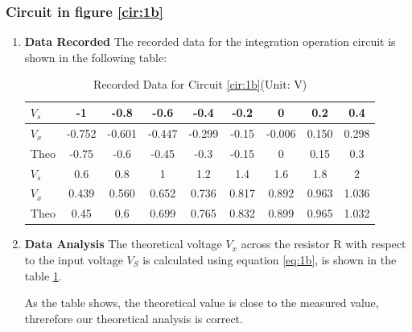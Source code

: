         \subsubsection{Circuit in figure \ref{cir:1b}}
        \begin{enumerate}[I]
            \item \textbf{Data Recorded}\newline
                The recorded data for the integration operation circuit is shown in the following table:
                \begin{table}[H]
                    \centering
                    \begin{tabular}{l|cccccccc}
                        \toprule
                        $V_s$ & -1     & -0.8   & -0.6   & -0.4   & -0.2  & 0      & 0.2   & 0.4   \\
                        \midrule
                        $V_x$ & -0.752 & -0.601 & -0.447 & -0.299 & -0.15 & -0.006 & 0.150 & 0.298 \\
                        Theo  & -0.75  & -0.6   & -0.45  & -0.3   & -0.15 & 0      & 0.15  & 0.3   \\
                        \bottomrule
                        \toprule
                        $V_s$ & 0.6    & 0.8    & 1      & 1.2    & 1.4   & 1.6    & 1.8   & 2     \\
                        \midrule
                        $V_x$ & 0.439  & 0.560  & 0.652  & 0.736  & 0.817 & 0.892  & 0.963 & 1.036 \\
                        Theo  & 0.45   & 0.6    & 0.699  & 0.765  & 0.832 & 0.899  & 0.965 & 1.032 \\
                        \bottomrule
                        \end{tabular}
                    \caption{Recorded Data for Circuit \ref{cir:1b}(Unit: V)}
                    \label{tab:1b}
                \end{table}
            \item \textbf{Data Analysis}\newline
                The theoretical voltage $V_x$ across the resistor R with respect to the input voltage $V_S$ is calculated using equation \ref{eq:1b}, is shown in the table \ref{tab:1b}.\par
                
                As the table shows, the theoretical value is close to the measured value, threrefore our theoretical analysis is correct.
        \end{enumerate}

